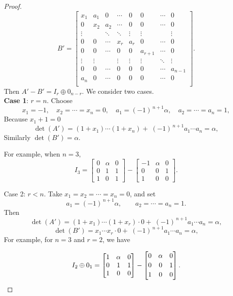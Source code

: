 \documentclass[11pt, a4paper]{amsart}
\theoremstyle{definition}
\numberwithin{equation}{section}
\begin{document}
\begin{proof}
\[
B'=
\begin{bmatrix}
x_1 & a_1 & 0 & \cdots & 0 & 0 & \cdots & 0\\
0 & x_2 & a_2 & \cdots & 0 & 0 & \cdots & 0\\
\vdots & & \ddots & \ddots & \vdots & \vdots & & \vdots\\
0 & 0 & \cdots & x_r & a_r & 0 & \cdots & 0\\
0 & 0 & \cdots & 0 & 0 & a_{r+1} & \cdots & 0\\
\vdots & \vdots & & \vdots & \vdots & \vdots & \ddots & \vdots\\
0 & 0 & \cdots & 0 & 0 & 0 & \cdots  & a_{n-1} \\
a_n & 0 & \cdots & 0 & 0 & 0 & \cdots  & 0 \\
\end{bmatrix}.
\]
Then $A'-B' =I_r\oplus 0_{n-r}. $ We consider two cases. \\ 

\textbf{Case 1}: \(r=n\). Choose
\[
x_1=-1,\quad x_2=\cdots=x_n=0,\quad a_1=(-1)^{\,n+1}\alpha,\quad a_2=\cdots=a_n=1,
\]
Because $x_1+1=0$
\[
\det(A')= (1+x_1) \cdots(1+x_n)+\;(-1)^{\,n+1}a_1\cdots a_n=\alpha,
\]
Similarly $\det(B')=\alpha$. 

For example, when \(n=3\),
\[
I_3=\begin{bmatrix}0&\alpha&0\\[2pt]0&1&1\\[2pt]1&0&1\end{bmatrix}
-\begin{bmatrix}-1&\alpha&0\\[2pt]0&0&1\\[2pt]1&0&0\end{bmatrix}.
\]

Case 2: \(r<n\). Take \(x_{1}=x_2=\cdots=x_n=0\), and set
\[
a_1=(-1)^{\,n+1}\alpha,\qquad a_2=\cdots=a_n=1.
\]
Then 
\[
\det(A')=(1+x_1)\cdots(1+x_r)\cdot 0+\;(-1)^{\,n+1}a_1\cdots a_n=\alpha,
\]
\[
\det(B')=x_1\cdots x_r\cdot 0+\;(-1)^{\,n+1}a_1\cdots a_n=\alpha,
\]
For example, for $n=3$ and $r=2$, we have

\[
I_2 \oplus 0_1=\begin{bmatrix}1& \alpha& 0\\ 0&1&1\\ 1&0&0 \end{bmatrix}
-\begin{bmatrix}0&\alpha&0\\[2pt]0&0&1\\[2pt]1&0&0\end{bmatrix}.
\qedhere
\]
\end{proof}
\end{document}
